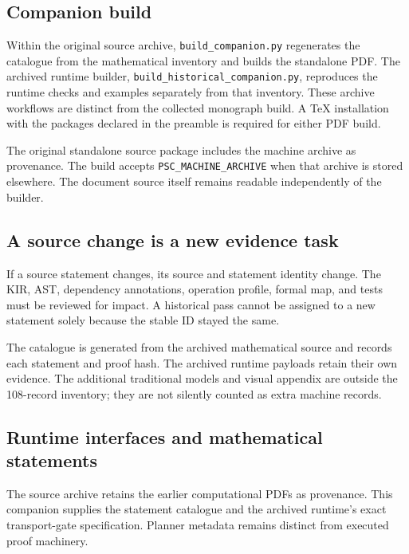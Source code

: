 \documentclass[a4paper,11pt]{article}
\begin{document}
\subsection{Companion build}
Within the original source archive, \nolinkurl{build_companion.py} regenerates the catalogue from the mathematical inventory and builds the standalone PDF. The archived runtime builder, \nolinkurl{build_historical_companion.py}, reproduces the runtime checks and examples separately from that inventory. These archive workflows are distinct from the collected monograph build. A TeX installation with the packages declared in the preamble is required for either PDF build.

The original standalone source package includes the machine archive as provenance. The build accepts \nolinkurl{PSC_MACHINE_ARCHIVE} when that archive is stored elsewhere. The document source itself remains readable independently of the builder.
\subsection{A source change is a new evidence task}
If a source statement changes, its source and statement identity change. The KIR, AST, dependency annotations, operation profile, formal map, and tests must be reviewed for impact. A historical pass cannot be assigned to a new statement solely because the stable ID stayed the same.

The catalogue is generated from the archived mathematical source and records each statement and proof hash. The archived runtime payloads retain their own evidence. The additional traditional models and visual appendix are outside the 108-record inventory; they are not silently counted as extra machine records.
\subsection{Runtime interfaces and mathematical statements}
The source archive retains the earlier computational PDFs as provenance. This companion supplies the statement catalogue and the archived runtime's exact transport-gate specification. Planner metadata remains distinct from executed proof machinery.
\end{document}
